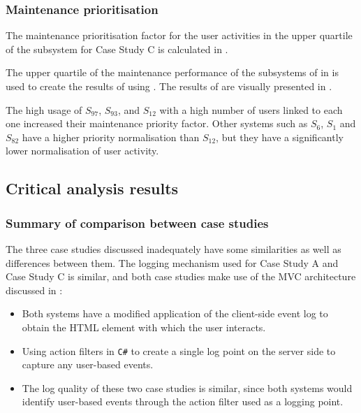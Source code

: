 \subsubsection{Maintenance prioritisation}
The maintenance prioritisation factor for the user activities in the upper quartile of the subsystem for Case Study C is calculated in .



The upper quartile of the maintenance performance of the subsystems of  in  is used to create the results of  using . The results of  are visually presented in .\par The high usage of $S_{97}$, $S_{93}$, and $S_{12}$ with a high number of users linked to each one increased their maintenance priority factor. Other systems such as $S_{6}$, $S_{1}$ and $S_{82}$ have a higher priority normalisation than $S_{12}$, but they have a significantly lower normalisation of user activity.

\subsection{Critical analysis results}\label{sec:ch3_criticalAnalysis}

\subsubsection{Summary of comparison between case studies}
The three case studies discussed inadequately  have some similarities as well as differences between them. The logging mechanism used for Case Study A and Case Study C is similar, and both case studies make use of the MVC architecture discussed in :

\begin{itemize}
	\item Both systems have a modified application of the  client-side event log to obtain the HTML element with which the user interacts.
	\item Using action filters in \texttt{C\#} to create a single log point on the server side to capture any user-based events. 
	\item The log quality of these two case studies is similar, since both systems would identify user-based events through the action filter used as a logging point.
\end{itemize}

